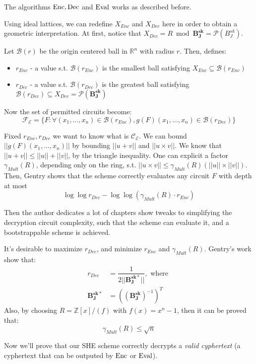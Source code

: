The algorithms $\operatorname{Enc},\operatorname{Dec}$ and $\operatorname{Eval}$ works as described before. 

Using ideal lattices, we can redefine $X_{Enc}$ and $X_{Dec}$ here in order to obtain a geometric interpretation. At first, notice that $X_{Dec}=R\bmod\mathbf{B_J^{sk}}=\mathcal{P}(B_J^{sk})$.

Let $\mathcal{B}(r)$ be the origin centered ball in $\mathbb{R}^n$ with radius $r$. Then, defines:
\begin{itemize}
    \item $r_{Enc}$ - a value s.t.  $\mathcal{B}(r_{Enc})$ is the smallest ball satisfying  $X_{Enc}\subseteq\mathcal{B}(r_{Enc})$
    \item $r_{Dec}$ - a value s.t. $\mathcal{B}(r_{Dec})$ is the greatest ball satisfying $\mathcal{B}(r_{Dec})\subseteq X_{Dec}=\mathcal{P}(\mathbf{B_J^{sk}})$
\end{itemize}
Now the set of permitted circuits become:
$$\mathcal{F_E}=\{F:\forall (x_1,\ldots,x_n)\in \mathcal{B}(r_{Enc}), g(F)(x_1,\ldots,x_n)\in \mathcal{B}(r_{Dec})\}$$

Fixed $r_{Enc},r_{Dec}$ we want to know what is $\mathcal{C_E}$. We can bound $||g(F)(x_1,\ldots,x_n)||$ by bounding $||u+v||$ and $||u\times v||$. We know that $||u+v||\leq ||u||+||v||$, by the triangle inequality. One can explicit a factor $\gamma_{Mult}(R)$, depending only on the ring, s.t. $||u\times v||\leq\gamma_{Mult}(R)(||u||\times||v||)$.
Then, Gentry shows that the scheme correctly evaluates any circuit $F$ with depth at most
$$\log\log r_{Dec}-\log\log(\gamma_{Mult}(R)\cdot r_{Enc})$$

Then the author dedicates a lot of chapters show tweaks to  simplifying the decryption circuit complexity, such that the scheme can evaluate it, and a bootstrappable scheme is achieved.

It's desirable to maximize $r_{Dec}$, and minimize $r_{Enc}$ and $\gamma_{Mult}(R)$. Gentry's work show that:
\begin{align*}
    r_{Dec}&=\dfrac{1}{2||\mathbf{B_J^{sk*}}||},\text{ where }\\
    \mathbf{B_J^{sk*}}&=((\mathbf{B_J^{sk}})^{-1})^T
\end{align*}
Also, by choosing $R=\mathbb{Z}[x]/(f)$ with $f(x)=x^n-1$, then it can be proved that:
$$\gamma_{Mult}(R)\leq\sqrt{n}$$

Now we'll prove that our SHE scheme correctly decrypts a \textit{valid cyphertext} (a cyphertext that can be outputed by $\operatorname{Enc}$ or $\operatorname{Eval}$).


